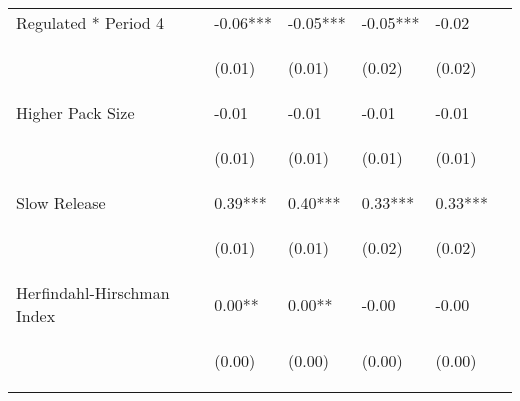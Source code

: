 \documentclass[12pt]{article}
\begin{document}
\begin{center}
\begin{longtable}{p{}p{}p{}p{}p{}p{}}
Regulated * Period 4 & -0.06*** & -0.05*** & -0.05*** & -0.02 \\
\vspace{2pt} & \begin{footnotesize}(0.01)\end{footnotesize} & \begin{footnotesize}(0.01)\end{footnotesize} & \begin{footnotesize}(0.02)\end{footnotesize} & \begin{footnotesize}(0.02)\end{footnotesize} \\
Higher Pack Size & -0.01 & -0.01 & -0.01 & -0.01 \\
\vspace{2pt} & \begin{footnotesize}(0.01)\end{footnotesize} & \begin{footnotesize}(0.01)\end{footnotesize} & \begin{footnotesize}(0.01)\end{footnotesize} & \begin{footnotesize}(0.01)\end{footnotesize} \\
Slow Release & 0.39*** & 0.40*** & 0.33*** & 0.33*** \\
\vspace{2pt} & \begin{footnotesize}(0.01)\end{footnotesize} & \begin{footnotesize}(0.01)\end{footnotesize} & \begin{footnotesize}(0.02)\end{footnotesize} & \begin{footnotesize}(0.02)\end{footnotesize} \\
Herfindahl-Hirschman Index & 0.00** & 0.00** & -0.00 & -0.00 \\
\vspace{2pt} & \begin{footnotesize}(0.00)\end{footnotesize} & \begin{footnotesize}(0.00)\end{footnotesize} & \begin{footnotesize}(0.00)\end{footnotesize} & \begin{footnotesize}(0.00)\end{footnotesize} \\

\end{longtable}
\end{center}
\end{document}
